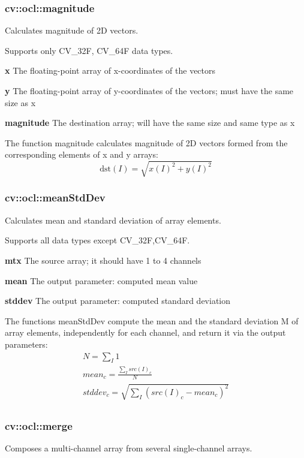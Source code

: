 \documentclass{article}
\begin{document}
\subsubsection{cv::ocl::magnitude}
\label{subsubsec:mylabel18}
Calculates magnitude of 2D vectors.

Supports only CV{\_}32F, CV{\_}64F data types.

\textbf{x }The floating-point array of x-coordinates of the vectors

\textbf{y }The floating-point array of y-coordinates of the vectors; must
have the same size as x

\textbf{magnitude }The destination array; will have the same size and same
type as x

The function magnitude calculates magnitude of 2D vectors formed from the
corresponding elements of x and y arrays:
\[
\mbox{dst}\left( I \right)=\sqrt {x\left( I \right)^2+y\left( I \right)^2}
\]
\newpage

\subsubsection{cv::ocl::meanStdDev}
\label{subsubsec:mylabel19}
Calculates mean and standard deviation of array elements.

Supports all data types except CV{\_}32F,CV{\_}64F.

\textbf{mtx }The source array; it should have 1 to 4 channels

\textbf{mean }The output parameter: computed mean value

\textbf{stddev }The output parameter: computed standard deviation

The functions meanStdDev compute the mean and the standard deviation M of
array elements, independently for each channel, and return it via the output
parameters:
\[
\begin{array}{l}
 N=\sum\nolimits_I 1 \\
 mean_c =\frac{\sum\nolimits_I {src(I)_c } }{N} \\
 stddev_c =\sqrt {\sum\nolimits_I {(src(I)_c -mean_c )^2} } \\
 \end{array}
\]
\newpage

\subsubsection{cv::ocl::merge }
\label{subsubsec:mylabel20}
Composes a multi-channel array from several single-channel arrays.
\end{document}
